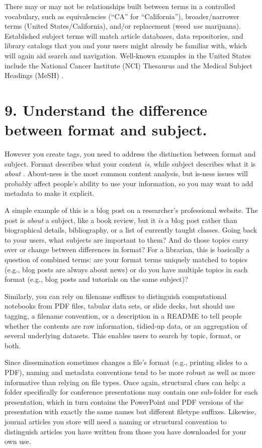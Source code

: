 \documentclass[10pt,letterpaper]{article}
\newcommand{\rulemajor}[1]{\section*{#1}}
\begin{document}
There may or may not be relationships built between terms in a controlled
vocabulary, such as equivalencies (``CA'' for ``California''), broader/narrower
terms (United States/California), and/or replacement (weed \emph{use}
marijuana). Established subject terms will match article databases, data
repositories, and library catalogs that you and your users might already be
familiar with, which will again aid search and navigation.  Well-known examples
in the United States include the National Cancer Institute (NCI) Thesaurus
\cite{NCI2020} and the Medical Subject Headings (MeSH) \cite{ASI2020}.

\rulemajor{9. Understand the difference between format and subject.}

However you create tags, you need to address the distinction between format and
subject. Format describes what your content \emph{is}, while subject describes
what it is \emph{about} \cite{Joudrey2015}. About-ness is the most common
content analysis, but is-ness issues will probably affect people's ability to
use your information, so you may want to add metadata to make it explicit.

A simple example of this is a blog post on a researcher's professional website. The post is \emph{about} a
subject, like a book review, but it \emph{is} a blog post rather than biographical details,
bibliography, or a list of currently taught classes.  Going back to your
users, what subjects are important to them? And do those topics carry over or
change between differences in format? For a librarian, this is basically a
question of combined terms: are your format terms uniquely matched to topics
(e.g., blog posts are always about news) or do you have multiple topics in each
format (e.g., blog posts and tutorials on the same subject)?

Similarly, you can rely on filename suffixes to distinguish computational
notebooks from PDF files, tabular data sets, or slide decks, but should use
tagging, a filename convention, or a description in a README to tell people
whether the contents are raw information, tidied-up data, or an aggregation of
several underlying datasets. This enables users to search by topic, format, or
both.

Since dissemination sometimes changes a file's format (e.g., printing slides to
a PDF), naming and metadata conventions tend to be more robust as well as more
informative than relying on file types. Once again, structural clues can help: a
folder specifically for conference presentations may contain one sub-folder for
each presentation, which in turn contains the PowerPoint and PDF versions of the
presentation with exactly the same names but different filetype suffixes.
Likewise, journal articles you store will need a naming or structural convention
to distinguish articles you have written from those you have downloaded for your
own use.
\end{document}
